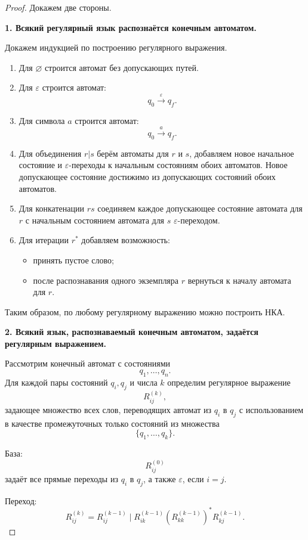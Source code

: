 \documentclass[12pt,a4paper]{article}
\theoremstyle{definition}
\theoremstyle{plain}
\begin{document}
\begin{proof}
Докажем две стороны.

\textbf{1. Всякий регулярный язык распознаётся конечным автоматом.}

Докажем индукцией по построению регулярного выражения.

\begin{enumerate}
    \item Для $\varnothing$ строится автомат без допускающих путей.
    \item Для $\varepsilon$ строится автомат:
    \[
    q_0 \xrightarrow{\varepsilon} q_f.
    \]
    \item Для символа $a$ строится автомат:
    \[
    q_0 \xrightarrow{a} q_f.
    \]
    \item Для объединения $r|s$ берём автоматы для $r$ и $s$, добавляем новое начальное состояние и $\varepsilon$-переходы к начальным состояниям обоих автоматов. Новое допускающее состояние достижимо из допускающих состояний обоих автоматов.
    \item Для конкатенации $rs$ соединяем каждое допускающее состояние автомата для $r$ с начальным состоянием автомата для $s$ $\varepsilon$-переходом.
    \item Для итерации $r^*$ добавляем возможность:
    \begin{itemize}
        \item принять пустое слово;
        \item после распознавания одного экземпляра $r$ вернуться к началу автомата для $r$.
    \end{itemize}
\end{enumerate}

Таким образом, по любому регулярному выражению можно построить НКА.

\textbf{2. Всякий язык, распознаваемый конечным автоматом, задаётся регулярным выражением.}

Рассмотрим конечный автомат с состояниями
\[
q_1,\ldots,q_n.
\]
Для каждой пары состояний $q_i,q_j$ и числа $k$ определим регулярное выражение
\[
R_{ij}^{(k)},
\]
задающее множество всех слов, переводящих автомат из $q_i$ в $q_j$ с использованием в качестве промежуточных только состояний из множества
\[
\{q_1,\ldots,q_k\}.
\]

База:
\[
R_{ij}^{(0)}
\]
задаёт все прямые переходы из $q_i$ в $q_j$, а также $\varepsilon$, если $i=j$.

Переход:
\[
R_{ij}^{(k)}
=
R_{ij}^{(k-1)}
\mid
R_{ik}^{(k-1)}
\left(R_{kk}^{(k-1)}\right)^*
R_{kj}^{(k-1)}.
\]


\end{proof}
\end{document}
